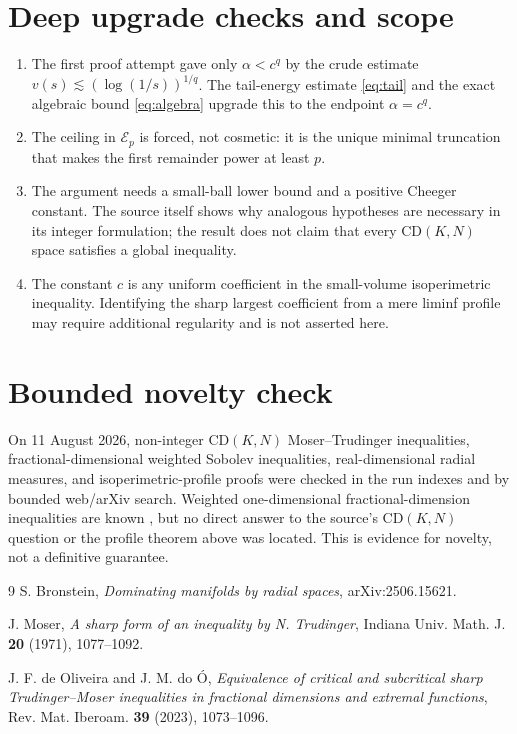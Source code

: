 \documentclass[11pt]{article}
\begin{document}
\section*{Deep upgrade checks and scope}
\begin{enumerate}[leftmargin=2em]
\item The first proof attempt gave only $\alpha<c^q$ by the crude estimate $v(s)\lesssim(\log(1/s))^{1/q}$.  The tail-energy estimate \eqref{eq:tail} and the exact algebraic bound \eqref{eq:algebra} upgrade this to the endpoint $\alpha=c^q$.
\item The ceiling in $\mathcal E_p$ is forced, not cosmetic: it is the unique minimal truncation that makes the first remainder power at least $p$.
\item The argument needs a small-ball lower bound and a positive Cheeger constant.  The source itself shows why analogous hypotheses are necessary in its integer formulation; the result does not claim that every $\mathrm{CD}(K,N)$ space satisfies a global inequality.
\item The constant $c$ is any uniform coefficient in the small-volume isoperimetric inequality.  Identifying the sharp largest coefficient from a mere liminf profile may require additional regularity and is not asserted here.
\end{enumerate}

\section*{Bounded novelty check}
On 11 August 2026, non-integer $\mathrm{CD}(K,N)$ Moser--Trudinger inequalities, fractional-dimensional weighted Sobolev inequalities, real-dimensional radial measures, and isoperimetric-profile proofs were checked in the run indexes and by bounded web/arXiv search.  Weighted one-dimensional fractional-dimension inequalities are known \cite{OliveiraDoO}, but no direct answer to the source's $\mathrm{CD}(K,N)$ question or the profile theorem above was located.  This is evidence for novelty, not a definitive guarantee.

\begin{thebibliography}{9}
S. Bronstein,
\emph{Dominating manifolds by radial spaces},
arXiv:2506.15621.

J. Moser,
\emph{A sharp form of an inequality by N. Trudinger},
Indiana Univ. Math. J. \textbf{20} (1971), 1077--1092.

J. F. de Oliveira and J. M. do \'O,
\emph{Equivalence of critical and subcritical sharp Trudinger--Moser inequalities in fractional dimensions and extremal functions},
Rev. Mat. Iberoam. \textbf{39} (2023), 1073--1096.
\end{thebibliography}
\end{document}
